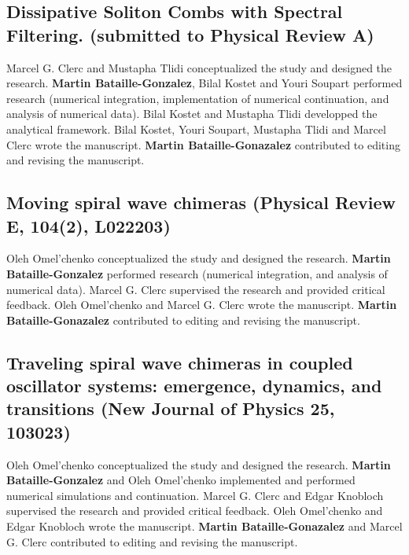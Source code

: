 \subsection{Dissipative Soliton Combs with Spectral Filtering. (submitted to Physical Review A)}
Marcel G. Clerc and Mustapha Tlidi conceptualized the study and designed the research. {\bf Martin Bataille-Gonzalez},
Bilal Kostet and Youri Soupart performed research (numerical integration, implementation of numerical continuation, and analysis of numerical data).
Bilal Kostet and Mustapha Tlidi developped the analytical framework.
Bilal Kostet, Youri Soupart, Mustapha Tlidi and Marcel Clerc wrote the manuscript. 
{\bf Martin Bataille-Gonazalez} contributed to editing and revising the manuscript.

\subsection{Moving spiral wave chimeras (Physical Review E, 104(2), L022203)}
Oleh Omel'chenko conceptualized the study and designed the research. {\bf Martin Bataille-Gonzalez} performed research (numerical integration, and analysis of numerical data).
Marcel G. Clerc supervised the research and provided critical feedback. Oleh Omel'chenko and Marcel G. Clerc wrote the manuscript. 
{\bf Martin Bataille-Gonazalez} contributed to editing and revising the manuscript.

\subsection{Traveling spiral wave chimeras in coupled
oscillator systems: emergence, dynamics, and
transitions (New Journal of Physics 25, 103023)}
Oleh Omel'chenko conceptualized the study and designed the research. 
{\bf Martin Bataille-Gonzalez} and Oleh Omel'chenko implemented and performed numerical simulations and continuation.
Marcel G. Clerc and Edgar Knobloch supervised the research and provided critical feedback. Oleh Omel'chenko and Edgar Knobloch wrote the manuscript. 
{\bf Martin Bataille-Gonazalez} and Marcel G. Clerc contributed to editing and revising the manuscript.